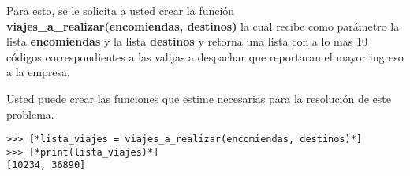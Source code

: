 Para esto, se le solicita a usted crear la función \textbf{viajes\_a\_realizar(encomiendas, destinos)} la cual recibe como parámetro la lista \textbf{encomiendas} y la lista \textbf{destinos} y retorna una lista con a lo mas 10 códigos correspondientes a las valijas a despachar que reportaran el mayor ingreso a la empresa.

Usted puede crear las funciones que estime necesarias para la resolución de este problema. 


\begin{lstlisting}[style=consola]
>>> [*lista_viajes = viajes_a_realizar(encomiendas, destinos)*]
>>> [*print(lista_viajes)*]
[10234, 36890]
\end{lstlisting}
